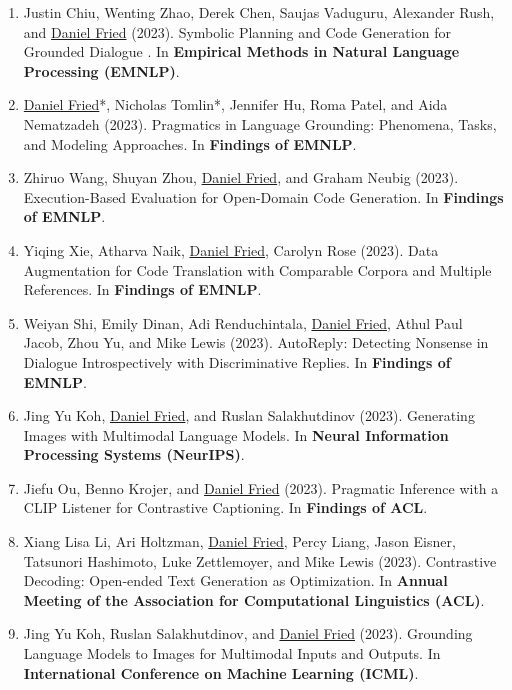 \begin{enumerate}[leftmargin=-1mm,partopsep=0pt]
\item Justin Chiu, Wenting Zhao, Derek Chen, Saujas Vaduguru, Alexander Rush, and \underline{Daniel Fried} (2023). Symbolic Planning and Code Generation for Grounded Dialogue . In \textbf{Empirical Methods in Natural Language Processing (EMNLP)}.

\item \underline{Daniel Fried}*, Nicholas Tomlin*, Jennifer Hu, Roma Patel, and Aida Nematzadeh (2023). Pragmatics in Language Grounding: Phenomena, Tasks, and Modeling Approaches. In \textbf{Findings of EMNLP}.

\item Zhiruo Wang, Shuyan Zhou, \underline{Daniel Fried}, and Graham Neubig (2023). Execution-Based Evaluation for Open-Domain Code Generation. In \textbf{Findings of EMNLP}.

\item Yiqing Xie, Atharva Naik, \underline{Daniel Fried}, Carolyn Rose (2023). Data Augmentation for Code Translation with Comparable Corpora and Multiple References. In \textbf{Findings of EMNLP}.

\item Weiyan Shi, Emily Dinan, Adi Renduchintala, \underline{Daniel Fried}, Athul Paul Jacob, Zhou Yu, and Mike Lewis (2023). {AutoReply}: Detecting Nonsense in Dialogue Introspectively with Discriminative Replies. In \textbf{Findings of EMNLP}.

\item Jing Yu Koh, \underline{Daniel Fried}, and Ruslan Salakhutdinov (2023). Generating Images with Multimodal Language Models. In \textbf{Neural Information Processing Systems (NeurIPS)}.

\item Jiefu Ou, Benno Krojer, and \underline{Daniel Fried} (2023). Pragmatic Inference with a {CLIP} Listener for Contrastive Captioning. In \textbf{Findings of ACL}.

\item Xiang Lisa Li, Ari Holtzman, \underline{Daniel Fried}, Percy Liang, Jason Eisner, Tatsunori Hashimoto, Luke Zettlemoyer, and Mike Lewis (2023). Contrastive Decoding: Open-ended Text Generation as Optimization. In \textbf{Annual Meeting of the Association for Computational Linguistics (ACL)}.

\item Jing Yu Koh, Ruslan Salakhutdinov, and \underline{Daniel Fried} (2023). Grounding Language Models to Images for Multimodal Inputs and Outputs. In \textbf{International Conference on Machine Learning (ICML)}.


\end{enumerate}
